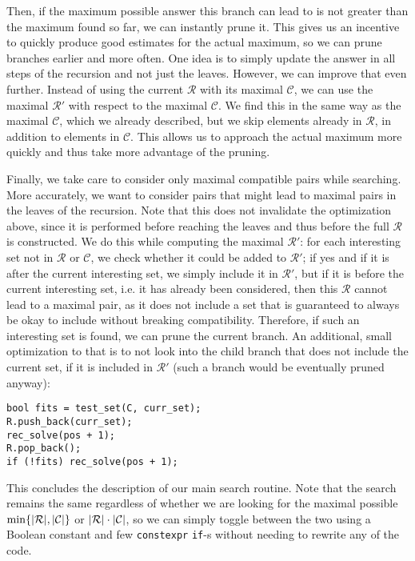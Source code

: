 \documentclass{report}
\DeclarePairedDelimiter{\set}{\{}{\}}
\DeclarePairedDelimiter{\abs}{\lvert}{\rvert}
\theoremstyle{definition}
\begin{document}
Then, if the maximum possible answer this branch can lead to is not greater than
the maximum found so far, we can instantly prune it. This gives us an incentive to
quickly produce good estimates for the actual maximum, so we can prune branches
earlier and more often. One idea is to simply update the answer in all steps
of the recursion and not just the leaves. However, we can improve that even further.
Instead of using the current $\mathcal{R}$ with its maximal $\mathcal{C}$, we can
use the maximal $\mathcal{R}'$ with respect to the maximal $\mathcal{C}$. We find
this in the same way as the maximal $\mathcal{C}$, which we already described,
but we skip elements already in $\mathcal{R}$, in addition to elements in
$\mathcal{C}$. This allows us to approach the actual maximum more quickly and thus
take more advantage of the pruning.

Finally, we take care to consider only maximal compatible pairs while searching. More
accurately, we want to consider pairs that might lead to maximal pairs in the leaves
of the recursion. Note that this does not invalidate the optimization above, since
it is performed before reaching the leaves and thus before the full $\mathcal{R}$
is constructed. We do this while computing the maximal $\mathcal{R}'$:
for each interesting set not in $\mathcal{R}$ or $\mathcal{C}$, we check whether
it could be added to $\mathcal{R}'$; if yes and if it is after the current
interesting set, we simply include it in $\mathcal{R}'$, but if it is before the
current interesting set, i.e. it has already been considered, then this $\mathcal{R}$
cannot lead to a maximal pair, as it does not include a set that is guaranteed to
always be okay to include without breaking compatibility. Therefore, if such an
interesting set is found, we can prune the current branch. An additional, small
optimization to that is to not look into the child branch that does not include
the current set, if it is included in $\mathcal{R}'$ (such a branch would be
eventually pruned anyway):

\begin{lstlisting}
bool fits = test_set(C, curr_set);
R.push_back(curr_set);
rec_solve(pos + 1);
R.pop_back();
if (!fits) rec_solve(pos + 1);
\end{lstlisting}

This concludes the description of our main search routine. Note that the search
remains the same regardless of whether we are looking for the maximal possible
$\min\set{\abs{\mathcal{R}}, \abs{\mathcal{C}}}$ or
$\abs{\mathcal{R}} \cdot \abs{\mathcal{C}}$, so we can simply toggle between the
two using a Boolean constant and few \verb|constexpr| \verb|if|-s without needing
to rewrite any of the code.
\end{document}
